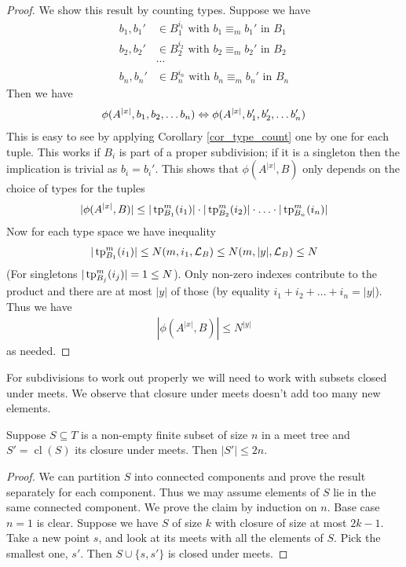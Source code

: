 \documentclass{amsart}
\DeclareMathOperator{\cl}{cl}
\begin{document}
\begin{proof}
	We show this result by counting types. Suppose we have
	\begin{align*}
		b_1, b_1' &\in B_1^{i_1} \text{ with } b_1 \equiv_m b_1' \text { in } B_1 \\
		b_2, b_2' &\in B_2^{i_2} \text{ with } b_2 \equiv_m b_2' \text { in } B_2 \\
		&\cdots \\
		b_n, b_n' &\in B_n^{i_n} \text{ with } b_n \equiv_m b_n' \text { in } B_n
	\end{align*}
	Then we have
	\begin{align*}
		\phi(A^{|x|}, b_1, b_2, \ldots b_n) \Leftrightarrow \phi(A^{|x|}, b_1', b_2', \ldots b_n')
	\end{align*}
	This is easy to see by applying Corollary \ref{cor_type_count} one by one for each tuple. This works if $B_i$ is part of a proper subdivision; if it is a singleton then the implication is trivial as $b_i = b_i'$.
	This shows that $\phi(A^{|x|}, B)$ only depends on the choice of types for the tuples
	\begin{align*}
		|\phi(A^{|x|}, B)| \leq |\operatorname{tp}^m_{B_1}(i_1)| \cdot |\operatorname{tp}^m_{B_2}(i_2)| \cdot \ldots \cdot |\operatorname{tp}^m_{B_n}(i_n)|
	\end{align*}
	Now for each type space we have inequality
	\begin{align*}
		|\operatorname{tp}^m_{B_1}(i_1)| \leq N(m, i_1, \mathcal L_B) \leq N(m, |y|, \mathcal L_B) \leq N
	\end{align*}
	(For singletons $|\operatorname{tp}^m_{B_j}(i_j)| = 1 \leq N$). Only non-zero indexes contribute to the product and there are at most $|y|$ of those (by equality $i_1 + i_2 + \ldots + i_n = |y|$). Thus we have
	\begin{align*}
		|\phi(A^{|x|}, B)| \leq N^{|y|}
	\end{align*}
	as needed.
\end{proof}

For subdivisions to work out properly we will need to work with subsets closed under meets. We observe that closure under meets doesn't add too many new elements.

\begin{Lemma} \label{lm_meet}
	Suppose $S \subseteq T$ is a non-empty finite subset of size $n$ in a meet tree and $S' = \cl(S)$ its closure under meets. Then $|S'| \leq 2n$.
\end{Lemma}
\begin{proof}
	We can partition $S$ into connected components and prove the result separately for each component. Thus we may assume elements of $S$ lie in the same connected component. We prove the claim by induction on $n$. Base case $n = 1$ is clear. Suppose we have $S$ of size $k$ with closure of size at most $2k - 1$. Take a new point $s$, and look at its meets with all the elements of $S$. Pick the smallest one, $s'$. Then $S \cup \{s, s'\}$ is closed under meets.
\end{proof}
\end{document}
